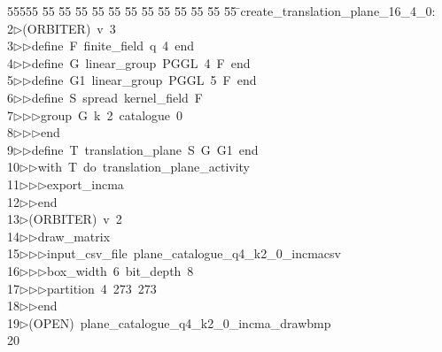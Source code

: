 %
%
\begin{tabbing}
55555 \= 55 \= 55 \= 55 \= 55 \= 55 \= 55 \= 55 \= 55 \= 55 \= 55 \= 55 \= 55 \= \>create\_translation\_plane\_16\_4\_0:\\[0pt]
2\>$\triangleright$\>(ORBITER)\ v\ 3\ \\[0pt]
3\>$\triangleright$\>$\triangleright$\>define\ F\ finite\_field\ q\ 4\ end\ \\[0pt]
4\>$\triangleright$\>$\triangleright$\>define\ G\ linear\_group\ PGGL\ 4\ F\ end\ \\[0pt]
5\>$\triangleright$\>$\triangleright$\>define\ G1\ linear\_group\ PGGL\ 5\ F\ end\ \\[0pt]
6\>$\triangleright$\>$\triangleright$\>define\ S\ spread\ kernel\_field\ F\ \\[0pt]
7\>$\triangleright$\>$\triangleright$\>$\triangleright$\>group\ G\ k\ 2\ catalogue\ 0\ \\[0pt]
8\>$\triangleright$\>$\triangleright$\>$\triangleright$\>end\ \\[0pt]
9\>$\triangleright$\>$\triangleright$\>define\ T\ translation\_plane\ S\ G\ G1\ end\ \\[0pt]
10\>$\triangleright$\>$\triangleright$\>with\ T\ do\ translation\_plane\_activity\ \\[0pt]
11\>$\triangleright$\>$\triangleright$\>$\triangleright$\>export\_incma\ \\[0pt]
12\>$\triangleright$\>$\triangleright$\>end\\[0pt]
13\>$\triangleright$\>(ORBITER)\ v\ 2\ \\[0pt]
14\>$\triangleright$\>$\triangleright$\>draw\_matrix\ \\[0pt]
15\>$\triangleright$\>$\triangleright$\>$\triangleright$\>input\_csv\_file\ plane\_catalogue\_q4\_k2\_0\_incmacsv\ \\[0pt]
16\>$\triangleright$\>$\triangleright$\>$\triangleright$\>box\_width\ 6\ bit\_depth\ 8\ \\[0pt]
17\>$\triangleright$\>$\triangleright$\>$\triangleright$\>partition\ 4\ 273\ 273\ \\[0pt]
18\>$\triangleright$\>$\triangleright$\>end\\[0pt]
19\>$\triangleright$\>(OPEN)\ plane\_catalogue\_q4\_k2\_0\_incma\_drawbmp\\[0pt]
20\>\end{tabbing}
